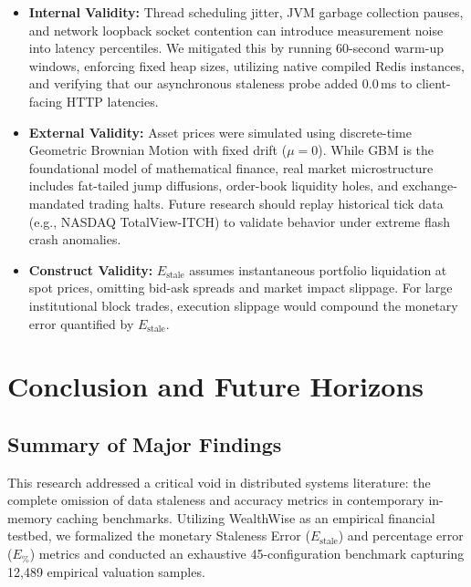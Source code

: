 \documentclass[11pt,a4paper]{article}
\begin{document}
\begin{itemize}[leftmargin=1.5em]
  \item \textbf{Internal Validity:} Thread scheduling jitter, JVM garbage collection pauses, and network loopback socket contention can introduce measurement noise into latency percentiles. We mitigated this by running 60-second warm-up windows, enforcing fixed heap sizes, utilizing native compiled Redis instances, and verifying that our asynchronous staleness probe added 0.0\,ms to client-facing HTTP latencies.
  \item \textbf{External Validity:} Asset prices were simulated using discrete-time Geometric Brownian Motion with fixed drift ($\mu=0$). While GBM is the foundational model of mathematical finance, real market microstructure includes fat-tailed jump diffusions, order-book liquidity holes, and exchange-mandated trading halts. Future research should replay historical tick data (e.g., NASDAQ TotalView-ITCH) to validate behavior under extreme flash crash anomalies.
  \item \textbf{Construct Validity:} $E_{\text{stale}}$ assumes instantaneous portfolio liquidation at spot prices, omitting bid-ask spreads and market impact slippage. For large institutional block trades, execution slippage would compound the monetary error quantified by $E_{\text{stale}}$.
\end{itemize}

\section{Conclusion and Future Horizons}
\label{sec:conclusion}

\subsection{Summary of Major Findings}

This research addressed a critical void in distributed systems literature: the complete omission of data staleness and accuracy metrics in contemporary in-memory caching benchmarks. Utilizing WealthWise as an empirical financial testbed, we formalized the monetary Staleness Error ($E_{\text{stale}}$) and percentage error ($E_{\%}$) metrics and conducted an exhaustive 45-configuration benchmark capturing 12{,}489 empirical valuation samples.
\end{document}
